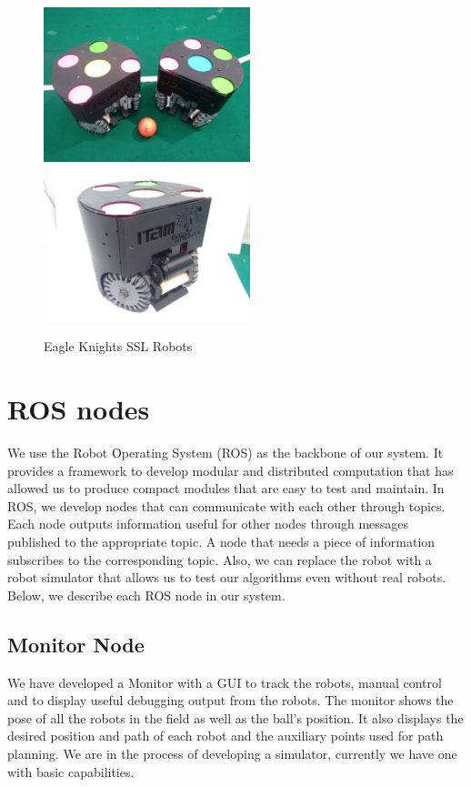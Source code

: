 \documentclass[]{llncs}
\newcommand{\TODO}[1]{{\textcolor{blue}{ToDo: {#1}}}}
\begin{document}

\begin{figure}[htb]
	\centering
	\includegraphics[width=6cm]{./pictures/two_ekbots.jpg}
	\includegraphics[width=6cm]{./pictures/ekbot_front.jpg}
	\caption{Eagle Knights SSL Robots}
	\label{fig:two-ekbots}  
\end{figure}


\section{ROS nodes}

We use the Robot Operating System (ROS) as the backbone of our system. It provides a framework to develop modular and distributed computation that has allowed us to produce compact modules that are easy to test and maintain. In ROS, we develop nodes that can communicate with each other through topics. Each node outputs information useful for other nodes through messages published to the appropriate topic. A node that needs a piece of information subscribes to the corresponding topic. Also, we can replace the robot with a robot simulator that allows us to test our algorithms even without real robots. Below, we describe each ROS node in our system.

\subsection{Monitor Node}
We have developed a Monitor with a GUI to track the robots, manual control and to display useful debugging output from the robots. The monitor shows the pose of all the robots in the field as well as the ball's position. It also displays the desired position and path of each robot and the auxiliary points used for path planning. We are in the process of developing a simulator, currently we have one with basic capabilities.
\end{document}
